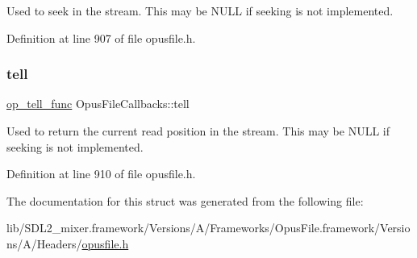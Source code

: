 Used to seek in the stream. This may be {\ttfamily N\+U\+LL} if seeking is not implemented. 

Definition at line 907 of file opusfile.\+h.

\mbox{\label{struct_opus_file_callbacks_a1464ae2f33850101add14a7eb278ff1c}} 
\subsubsection{\texorpdfstring{tell}{tell}}
{\footnotesize\ttfamily \mbox{\hyperlink{group__stream__callbacks_gaca012812dea4bc3a27b0c23575efecaf}{op\+\_\+tell\+\_\+func}} Opus\+File\+Callbacks\+::tell}

Used to return the current read position in the stream. This may be {\ttfamily N\+U\+LL} if seeking is not implemented. 

Definition at line 910 of file opusfile.\+h.



The documentation for this struct was generated from the following file\+:\begin{DoxyCompactItemize}
\item 
lib/\+S\+D\+L2\+\_\+mixer.\+framework/\+Versions/\+A/\+Frameworks/\+Opus\+File.\+framework/\+Versions/\+A/\+Headers/\mbox{\hyperlink{opusfile_8h}{opusfile.\+h}}\end{DoxyCompactItemize}
